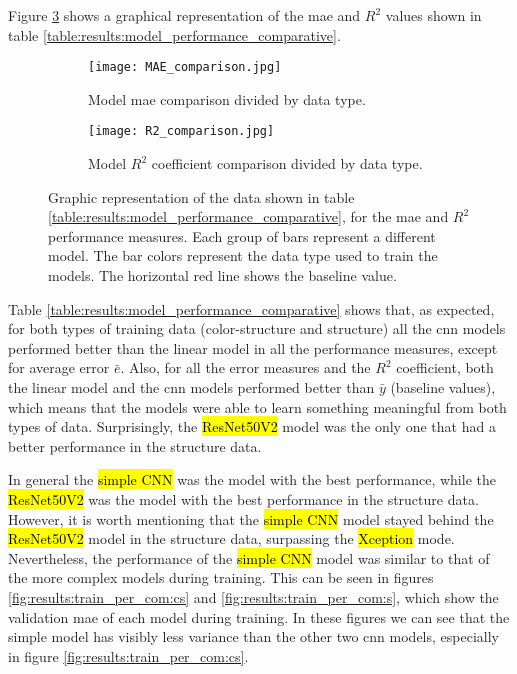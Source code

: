 Figure \ref{fig:results:performance_comp} shows a graphical representation of the \gls{mae} and $R^2$ values shown in table \ref{table:results:model_performance_comparative}.

\begin{figure}[!ht]
  \centering
  \begin{subfigure}[b]{.45\linewidth}
    \texttt{[image: MAE\_comparison.jpg]}
    \caption{Model \gls{mae} comparison divided by data type.}
    \label{fig:results:performance_comp:mae}
  \end{subfigure}%
  \vspace{3mm}
  \begin{subfigure}[b]{.45\linewidth}
    \texttt{[image: R2\_comparison.jpg]}
    \caption{Model $R^2$ coefficient comparison divided by data type.}
    \label{fig:results:performance_comp:r2}
  \end{subfigure}
  \caption{Graphic representation of the data shown in table \ref{table:results:model_performance_comparative}, for the \gls{mae} and $R^2$ performance measures. Each group of bars represent a different model. The bar colors represent the data type used to train the models. The horizontal red line shows the baseline value.}
  \label{fig:results:performance_comp}
\end{figure}

Table \ref{table:results:model_performance_comparative} shows that, as expected, for both types of training data (color-structure and structure) all the \gls{cnn} models performed better than the linear model in all the performance measures, except for average error $\bar{e}$.
Also, for all the error measures and the $R^2$ coefficient, both the linear model and the \gls{cnn} models performed better than $\bar{y}$ (baseline values), which means that the models were able to learn something meaningful from both types of data. Surprisingly, the \hl{ResNet50V2} model was the only one that had a better performance in the structure data.

In general the \hl{simple CNN} was the model with the best performance, while the \hl{ResNet50V2} was the model with the best performance in the structure data. However, it is worth mentioning that the \hl{simple CNN} model stayed behind the \hl{ResNet50V2} model in the structure data, surpassing the \hl{Xception} mode. Nevertheless, the performance of the \hl{simple CNN} model was similar to that of the more complex models during training.
This can be seen in figures \ref{fig:results:train_per_com:cs} and \ref{fig:results:train_per_com:s}, which show the validation \gls{mae} of each model during training.
In these figures we can see that the simple model has visibly less variance than the other two \gls{cnn} models, especially in figure \ref{fig:results:train_per_com:cs}.

